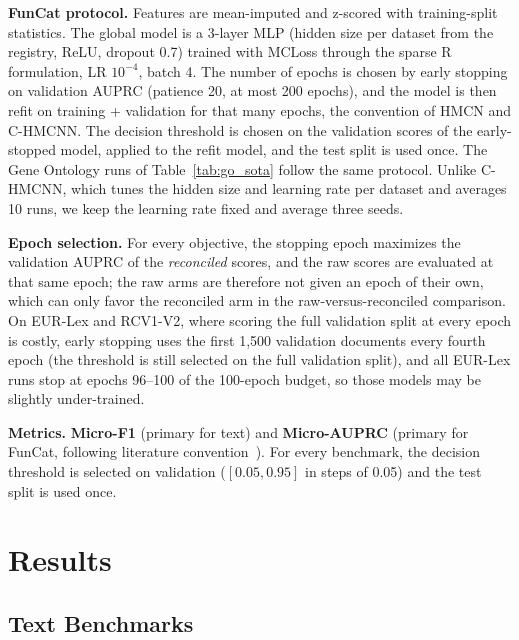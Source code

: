 \documentclass[preprint,12pt]{elsarticle}
\begin{document}
\textbf{FunCat protocol.} Features are mean-imputed and z-scored with
training-split statistics.  The global model is a 3-layer MLP (hidden
size per dataset from the registry, ReLU, dropout 0.7) trained with
MCLoss through the sparse R formulation, LR $10^{-4}$, batch 4.  The
number of epochs is chosen by early stopping on validation AUPRC
(patience 20, at most 200 epochs), and the model is then refit on
training + validation for that many epochs, the convention of HMCN and
C-HMCNN.  The decision threshold is chosen on the validation scores of the
early-stopped model, applied to the refit model, and the test
split is used once.  The Gene Ontology runs of Table~\ref{tab:go_sota}
follow the same protocol. Unlike C-HMCNN, which tunes the hidden size and
learning rate per dataset and averages 10 runs, we keep the learning rate
fixed and average three seeds.

\textbf{Epoch selection.} For every objective, the stopping epoch maximizes
the validation AUPRC of the \emph{reconciled} scores, and the raw scores are
evaluated at that same epoch; the raw arms are therefore not given an epoch of
their own, which can only favor the reconciled arm in the raw-versus-reconciled
comparison. On EUR-Lex and RCV1-V2, where scoring the full validation split at
every epoch is costly, early stopping uses the first 1{,}500 validation
documents every fourth epoch (the threshold is still selected on the full
validation split), and all EUR-Lex runs stop at epochs 96--100 of the
100-epoch budget, so those models may be slightly under-trained.

\textbf{Metrics.} \textbf{Micro-F1} (primary for text) and
\textbf{Micro-AUPRC} (primary for FunCat, following literature
convention~\cite{www2022ontology}). For every benchmark, the decision
threshold is selected on validation ($[0.05,0.95]$ in steps of 0.05)
and the test split is used once.

\section{Results}
\label{sec:results}

\subsection{Text Benchmarks}
\end{document}
